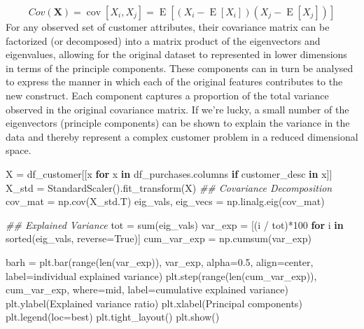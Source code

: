 \documentclass[]{tufte-book}
\newenvironment{Shaded}{}{}
\newcommand{\BuiltInTok}[1]{#1}
\newcommand{\CommentTok}[1]{\textcolor[rgb]{0.38,0.63,0.69}{\textit{#1}}}
\newcommand{\ControlFlowTok}[1]{\textcolor[rgb]{0.00,0.44,0.13}{\textbf{#1}}}
\newcommand{\DecValTok}[1]{\textcolor[rgb]{0.25,0.63,0.44}{#1}}
\newcommand{\FloatTok}[1]{\textcolor[rgb]{0.25,0.63,0.44}{#1}}
\newcommand{\KeywordTok}[1]{\textcolor[rgb]{0.00,0.44,0.13}{\textbf{#1}}}
\newcommand{\NormalTok}[1]{#1}
\newcommand{\OperatorTok}[1]{\textcolor[rgb]{0.40,0.40,0.40}{#1}}
\newcommand{\StringTok}[1]{\textcolor[rgb]{0.25,0.44,0.63}{#1}}
\newcommand{\VariableTok}[1]{\textcolor[rgb]{0.10,0.09,0.49}{#1}}
\theoremstyle{definition}
\theoremstyle{definition}
\theoremstyle{definition}
\theoremstyle{remark}
\begin{document}
\[ Cov(\mathbf{X}) = \operatorname{cov}[X_i, X_j] = \operatorname{E}[(X_i - \operatorname{E}[X_i])(X_j - \operatorname{E}[X_j])] \] For any observed set of customer attributes, their covariance matrix can be factorized (or decomposed) into a matrix product of the eigenvectors and eigenvalues, allowing for the original dataset to represented in lower dimensions in terms of the principle components. These components can in turn be analysed to express the manner in which each of the original features contributes to the new construct. Each component captures a proportion of the total variance observed in the original covariance matrix. If we're lucky, a small number of the eigenvectors (principle components) can be shown to explain the variance in the data and thereby represent a complex customer problem in a reduced dimensional space.

\begin{Shaded}
\begin{Highlighting}[]
\NormalTok{X }\OperatorTok{=}\NormalTok{ df\_customer[[x }\ControlFlowTok{for}\NormalTok{ x }\KeywordTok{in}\NormalTok{ df\_purchases.columns }
\ControlFlowTok{if} \StringTok{\textquotesingle{}customer\_desc\textquotesingle{}} \KeywordTok{in}\NormalTok{ x]]}
\NormalTok{X\_std }\OperatorTok{=}\NormalTok{ StandardScaler().fit\_transform(X)}
\CommentTok{\#\# Covariance Decomposition}
\NormalTok{cov\_mat }\OperatorTok{=}\NormalTok{ np.cov(X\_std.T)}
\NormalTok{eig\_vals, eig\_vecs }\OperatorTok{=}\NormalTok{ np.linalg.eig(cov\_mat)}

\CommentTok{\#\# Explained Variance}
\NormalTok{tot }\OperatorTok{=} \BuiltInTok{sum}\NormalTok{(eig\_vals)}
\NormalTok{var\_exp }\OperatorTok{=}\NormalTok{ [(i }\OperatorTok{/}\NormalTok{ tot)}\OperatorTok{*}\DecValTok{100} \ControlFlowTok{for}\NormalTok{ i }\KeywordTok{in} \BuiltInTok{sorted}\NormalTok{(eig\_vals, reverse}\OperatorTok{=}\VariableTok{True}\NormalTok{)]}
\NormalTok{cum\_var\_exp }\OperatorTok{=}\NormalTok{ np.cumsum(var\_exp)}

\NormalTok{barh }\OperatorTok{=}\NormalTok{ plt.bar(}\BuiltInTok{range}\NormalTok{(}\BuiltInTok{len}\NormalTok{(var\_exp)), var\_exp, alpha}\OperatorTok{=}\FloatTok{0.5}\NormalTok{, align}\OperatorTok{=}\StringTok{\textquotesingle{}center\textquotesingle{}}\NormalTok{,}
\NormalTok{        label}\OperatorTok{=}\StringTok{\textquotesingle{}individual explained variance\textquotesingle{}}\NormalTok{)}
\NormalTok{plt.step(}\BuiltInTok{range}\NormalTok{(}\BuiltInTok{len}\NormalTok{(cum\_var\_exp)), cum\_var\_exp, where}\OperatorTok{=}\StringTok{\textquotesingle{}mid\textquotesingle{}}\NormalTok{,}
\NormalTok{         label}\OperatorTok{=}\StringTok{\textquotesingle{}cumulative explained variance\textquotesingle{}}\NormalTok{)}
\NormalTok{plt.ylabel(}\StringTok{\textquotesingle{}Explained variance ratio\textquotesingle{}}\NormalTok{)}
\NormalTok{plt.xlabel(}\StringTok{\textquotesingle{}Principal components\textquotesingle{}}\NormalTok{)}
\NormalTok{plt.legend(loc}\OperatorTok{=}\StringTok{\textquotesingle{}best\textquotesingle{}}\NormalTok{)}
\NormalTok{plt.tight\_layout()}
\NormalTok{plt.show()}
\end{Highlighting}
\end{Shaded}
\end{document}

